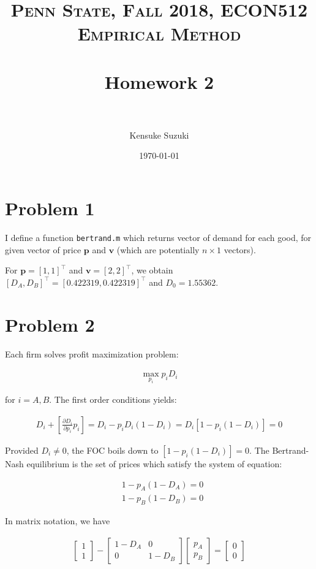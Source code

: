 \documentclass[11pt,letter]{article}
\title{	
\normalfont \normalsize 
\textsc{Penn State, Fall 2018, ECON512 Empirical Method} \\ [25pt] %
\horrule{0.5pt} \\[0.4cm] %
\huge Homework 2 \\ %
\horrule{2pt} \\[0.5cm] %
}
\author{Kensuke Suzuki} %
\date{\normalsize\today} %
\newcommand{\vect}[1]{\boldsymbol{\mathbf{#1}}}
\newcounter{lem}[section] \setcounter{lem}{0}
\newcommand{\lprn}[1]{\left[{#1}\right]}
\newcommand{\bmat}[1]{\begin{bmatrix} #1 \end{bmatrix}}%
\newcommand{\code}[1]{\texttt{#1}}
\begin{document}
\maketitle %

\section*{Problem 1}

I define a function \code{bertrand.m} which returns vector of demand for each good, for given vector of price $\vect{p}$ and $\vect{v}$ (which are potentially $n\times1$ vectors).



For $\vect{p}=[1,1]^\top$ and $\vect{v}=[2,2]^\top$, we obtain $[D_A,D_B]^\top = [0.422319, 0.422319]^\top$ and $D_0=1.55362$.


\section*{Problem 2}

Each firm solves profit maximization problem:

\begin{align*}
\max_{p_i} p_iD_i
\end{align*}

for $i=A,B$. The first order conditions yields:

\begin{align*}
D_i + \lprn{\frac{\partial D_i}{\partial p_i}p_i} = D_i-p_iD_i (1-D_i)=D_i\lprn{1-p_i(1-D_i)}=0
\end{align*}

Provided $D_i\neq0$, the FOC boils down to $\lprn{1-p_i(1-D_i)}=0$. The Bertrand-Nash equilibrium is the set of prices which satisfy the system of equation:

\begin{align*}
&1-p_A(1-D_A)=0\\
&1-p_B(1-D_B)=0
\end{align*}

In matrix notation, we have

\begin{align}
\bmat{1\\1} - \left[\begin{array}{cc} 1-D_A & 0 \\ 0 & 1-D_B \end{array}\right] \bmat{p_A\\p_B} = \bmat{0\\0} \label{FOCmatrix}
\end{align}
\end{document}
